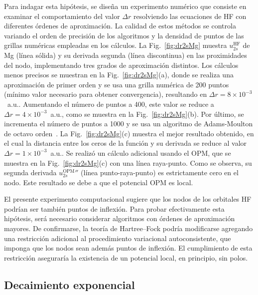 Para indagar esta hipótesis, se diseña un experimento numérico que 
consiste en examinar el comportamiento del valor $\Delta r$ resolviendo 
las ecuaciones de HF con diferentes órdenes de aproximación. La calidad 
de estos métodos se controla variando el orden de precisión de los 
algoritmos y la densidad de puntos de las grillas numéricas empleadas en 
los cálculos. La Fig.~\ref{fig:dr2sMg} muestra $u_{2s}^{\mathrm{HF}}$ de 
Mg (línea sólida) y su derivada segunda (línea discontinua) en las 
proximidades del nodo, implementando tres grados de aproximación 
distintos. Los cálculos menos precisos se muestran en la 
Fig.~\ref{fig:dr2sMg}(a), donde se realiza una aproximación de primer 
orden y se usa una grilla numérica de 200 puntos (mínimo valor necesario 
para obtener convergencia), resultando en 
$\Delta r=8\times 10^{-3}$~a.u.. Aumentando el número de puntos a 400, 
este valor se reduce a $\Delta r=4\times 10^{-3}$~a.u., como se muestra 
en la Fig.~\ref{fig:dr2sMg}(b). Por último, se incrementa el número de 
puntos a 1000 y se usa un algoritmo de Adams-Moulton de octavo 
orden~\cite{Johnson:07}. La Fig.~\ref{fig:dr2sMg}(c) muestra el mejor 
resultado obtenido, en el cual la distancia entre los ceros de la 
función y su derivada se reduce al valor 
$\Delta r=1\times 10^{-3}$~a.u.. Se realizó un cálculo adicional usando 
el OPM, que se muestra en la Fig.~\ref{fig:dr2sMg}(c) con una línea 
raya-punto. Como se observa, su segunda derivada 
$u_{2s}^{\mathrm{OPM}}''$ (línea punto-raya-punto) es estrictamente cero 
en el nodo. Este resultado se debe a que el potencial OPM es local. 

El presente experimento computacional sugiere que los nodos de los 
orbitales HF podrían ser también puntos de inflexión. Para probar 
efectivamente esta hipótesis, será necesario considerar algoritmos con 
órdenes de aproximación mayores. De confirmarse, la teoría de 
Hartree--Fock podría modificarse agregando una restricción adicional al 
procedimiento variacional autoconsistente, que imponga que los nodos 
sean además puntos de inflexión. El cumplimiento de esta restricción 
aseguraría la existencia de un potencial local, en principio, sin polos. 

\subsection{Decaimiento exponencial}
\label{subsec:decaimientoHF}

